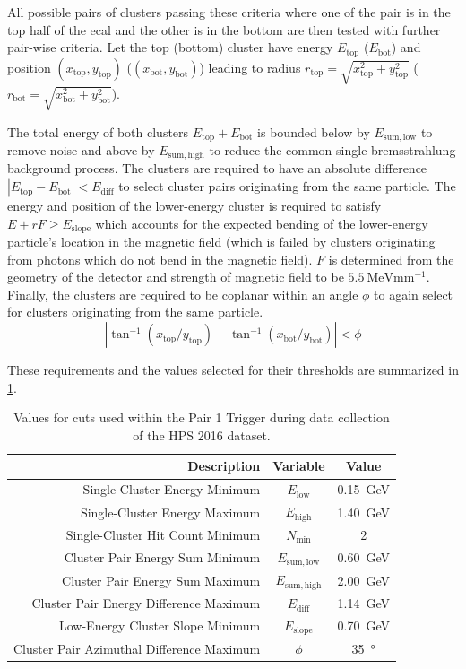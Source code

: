 All possible pairs of clusters passing these criteria where one of the pair is in the top half of
the \ac{ecal} and the other is in the bottom are then tested with further pair-wise criteria.
Let the top (bottom) cluster have energy $E_\mathrm{top}$ ($E_\mathrm{bot}$) and position
$(x_\mathrm{top},y_\mathrm{top})$ ($(x_\mathrm{bot},y_\mathrm{bot})$) leading to radius
$r_\mathrm{top} = \sqrt{x_\mathrm{top}^2+y_\mathrm{top}^2}$
($r_\mathrm{bot} = \sqrt{x_\mathrm{bot}^2+y_\mathrm{bot}^2}$).

The total energy of both clusters $E_\mathrm{top}+E_\mathrm{bot}$ is bounded below
by $E_\mathrm{sum,low}$ to remove noise and above by $E_\mathrm{sum,high}$ to reduce
the common single-bremsstrahlung background process.
The clusters are required to have an absolute difference $|E_\mathrm{top}-E_\mathrm{bot}| < E_\mathrm{diff}$
to select cluster pairs originating from the same particle.
The energy and position of the lower-energy cluster is required to satisfy
$E + r F \geq E_\mathrm{slope}$ which accounts for the expected bending of
the lower-energy particle's location in the magnetic field (which is failed
by clusters originating from photons which do not bend in the magnetic field).
$F$ is determined from the geometry of the detector and strength of magnetic
field to be $\qty{5.5}{\MeV\mm^{-1}}$.
Finally, the clusters are required to be coplanar within an angle $\phi$ to
again select for clusters originating from the same particle.
$$
  |\tan^{-1}(x_\mathrm{top}/y_\mathrm{top}) - \tan^{-1}(x_\mathrm{bot}/y_\mathrm{bot})| < \phi
$$

These requirements and the values selected for their thresholds are summarized
in \cref{tab:pair-1-trigger}.

\begin{table}[h]
  \centering
  \begin{tabular}{|r|c|c|}
    \hline
    Description & Variable & Value \\ \hline
    Single-Cluster Energy Minimum & $E_\mathrm{low}$ & \qty{0.15}{\GeV} \\
    Single-Cluster Energy Maximum & $E_\mathrm{high}$ & \qty{1.40}{\GeV} \\
    Single-Cluster Hit Count Minimum & $N_\mathrm{min}$ & 2 \\
    \hline
    Cluster Pair Energy Sum Minimum & $E_\mathrm{sum,low}$ & \qty{0.60}{\GeV} \\
    Cluster Pair Energy Sum Maximum & $E_\mathrm{sum,high}$ & \qty{2.00}{\GeV} \\
    Cluster Pair Energy Difference Maximum & $E_\mathrm{diff}$ & \qty{1.14}{\GeV} \\
    Low-Energy Cluster Slope Minimum & $E_\mathrm{slope}$ & \qty{0.70}{\GeV} \\
    Cluster Pair Azimuthal Difference Maximum & $\phi$ & \qty{35}{\degree} \\
    \hline
  \end{tabular}
  \caption{Values for cuts used within the Pair 1 Trigger during data collection of the HPS 2016 dataset.}
  \label{tab:pair-1-trigger}
\end{table}


